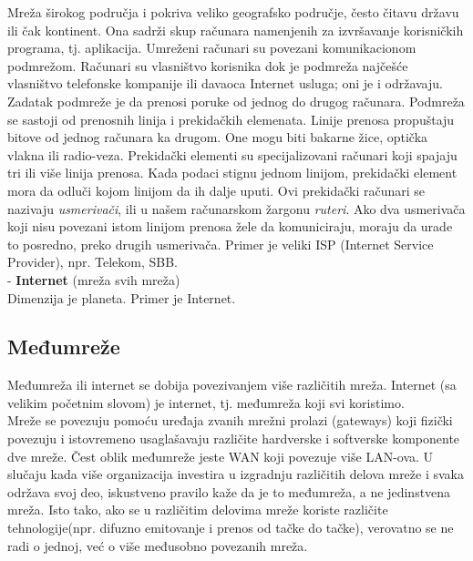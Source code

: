 \documentclass{article} %
\begin{document}
Mreža širokog područja i pokriva veliko geografsko područje, često čitavu državu ili čak kontinent. Ona sadrži skup računara namenjenih za izvršavanje korisničkih programa, tj. aplikacija. Umreženi računari su povezani komunikacionom podmrežom. Računari su vlasništvo korisnika dok je podmreža najčešće vlasništvo telefonske kompanije ili davaoca Internet usluga; oni je i održavaju. Zadatak podmreže je da prenosi poruke od jednog do drugog računara. Podmreža se sastoji od prenosnih linija i prekidačkih elemenata. Linije prenosa propuštaju bitove od jednog računara ka drugom. One mogu biti bakarne žice, optička vlakna ili radio-veza. Prekidački elementi su specijalizovani računari koji spajaju tri ili više linija prenosa. Kada podaci stignu jednom linijom, prekidački element mora da odluči kojom linijom da ih dalje uputi. Ovi prekidački računari se nazivaju \textit{usmerivači}, ili u našem računarskom žargonu \textit{ruteri}. Ako dva usmerivača koji nisu povezani istom linijom prenosa žele da komuniciraju, moraju da urade to posredno, preko drugih usmerivača.
Primer je veliki ISP (Internet Service Provider), npr. Telekom, SBB. \\
- \textbf{Internet} (mreža svih mreža) \\
Dimenzija je planeta. Primer je Internet.

\subsection{Međumreže}
Međumreža ili internet se dobija povezivanjem više različitih mreža.
Internet (sa velikim početnim slovom) je internet, tj. međumreža koji svi koristimo.\\
Mreže se povezuju pomoću uređaja zvanih mrežni prolazi (gateways) koji fizički povezuju i istovremeno usaglašavaju različite hardverske i softverske komponente dve mreže. Čest oblik međumreže jeste WAN koji povezuje više LAN-ova. U slučaju kada više organizacija investira u izgradnju različitih delova mreže i svaka održava svoj deo, iskustveno pravilo kaže da je to međumreža, a ne jedinstvena mreža. Isto tako, ako se u različitim delovima mreže koriste različite tehnologije(npr. difuzno emitovanje i prenos od tačke do tačke), verovatno se ne radi o jednoj, već o više međusobno povezanih mreža.
\end{document}
